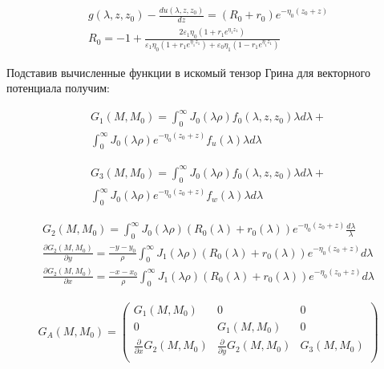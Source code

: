 	\begin{equation}
		\begin{aligned}
			g(\lambda, z, z_0) - \frac{du(\lambda, z, z_0)}{dz} = (R_0 + r_0)e^{-\eta_0(z_0+ z)} \\ R_0 = -1 + \frac{2 \varepsilon_1\eta_0(1+r_1e^{\eta_1z_1})}{\varepsilon_1\eta_0(1+r_1e^{\eta_1 z_1}) + \varepsilon_0\eta_1(1 - r_1e^{\eta_1 z_1})}
		\end{aligned}
	\end{equation}
	
	Подставив вычисленные функции в искомый тензор Грина для векторного потенциала получим:
	
	\begin{equation}
		\begin{aligned}
			G_1(M, M_0) = \int^\infty_0 J_0(\lambda \rho) f_0(\lambda, z, z_0) \lambda d \lambda + \\ \int^\infty_0J_0(\lambda \rho)e^{-\eta_0(z_0 + z)}f_u(\lambda) \lambda d \lambda 
		\end{aligned}
	\end{equation}
	
	
	\begin{equation}
		\begin{aligned}
			G_3(M, M_0) = \int^\infty_0 J_0(\lambda \rho) f_0(\lambda, z, z_0) \lambda d \lambda + \\ \int^\infty_0J_0(\lambda \rho)e^{-\eta_0(z_0 + z)}f_w(\lambda) \lambda d \lambda 
		\end{aligned}
	\end{equation}
	
	\begin{equation}
		\begin{aligned}
			G_2(M, M_0) = \int_0^\infty J_0(\lambda\rho)(R_0(\lambda) + r_0(\lambda))e^{-\eta_0(z_0 + z)} \frac{d \lambda}{\lambda} \\ \frac{\partial G_2(M, M_0)}{\partial y} = \frac{-y - y_0}{\rho} \int_0^\infty J_1(\lambda\rho)(R_0(\lambda) + r_0(\lambda))e^{-\eta_0(z_0 + z)} {d \lambda} \\ \frac{\partial G_2(M, M_0)}{\partial x} = \frac{-x - x_0}{\rho} \int_0^\infty J_1(\lambda\rho)(R_0(\lambda) + r_0(\lambda))e^{-\eta_0(z_0 + z)} {d \lambda} 
		\end{aligned}
	\end{equation}
	
	\begin{equation*}
		\begin{aligned}
			G_A(M, M_0) =
			 \begin{pmatrix} G_1(M, M_0) & 0 & 0 \\  
				   0 & G_1(M, M_0) & 0 \\ 
				   \frac{\partial}{\partial x}G_2(M, M_0) & \frac{\partial}{\partial y}G_2(M, M_0) & G_3(M, M_0) \\
			\end{pmatrix} \\	
		\end{aligned}
		\tag{30}
	\end{equation*}
	
